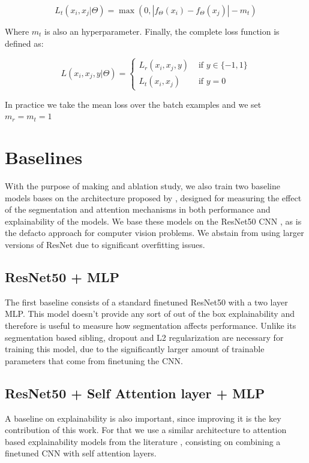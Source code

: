 \begin{equation}
	L_t(x_i,x_j | \Theta) = \max(0, |f_\Theta(x_i) - f_\Theta(x_j)| - m_t)
	\label{eq:t_loss}
\end{equation}

Where $m_t$ is also an hyperparameter. Finally, the complete loss function is defined as:

\begin{equation}
	L(x_i,x_j,y | \Theta) =\left\{\begin{matrix}
		L_r(x_i,x_j,y)&\text{ if } y \in \{-1,1\} \\
		L_t(x_i,x_j)&\text{ if } y=0
	\end{matrix}\right.
\end{equation}

In practice we take the mean loss over the batch examples and we set $m_r=m_t=1$

\section{Baselines}
With the purpose of making and ablation study, we also train two baseline models
bases on the architecture proposed by , designed for
measuring the effect of the segmentation and attention mechanisms in both performance
and explainability of the models. We base these models on the ResNet50 CNN \cite{he_resnet},
as is the defacto approach for computer vision problems. We abstain from using larger
versions of ResNet due to significant overfitting issues.

\subsection{ResNet50 + MLP}
The first baseline consists of a standard finetuned ResNet50 with a two layer MLP. This
model doesn't provide any sort of out of the box explainability and therefore is useful
to measure how segmentation affects performance.
Unlike its segmentation based sibling, dropout and L2 regularization are necessary for training
this model, due to the significantly larger amount of trainable parameters that come from finetuning the CNN.

\subsection{ResNet50 + Self Attention layer + MLP}

A baseline on explainability is also important, since improving it is the key contribution
of this work. For that we use a similar architecture to attention based explainability
models from the literature \cite{zhang_interpretable, cordonnier_relationship, bello_attention}, consisting on
combining a finetuned CNN with self attention layers.

